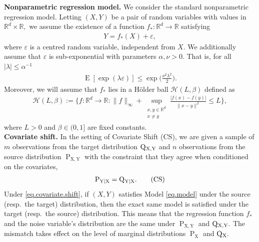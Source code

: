 \documentclass[10pt]{article}
\newcommand{\eps}{\varepsilon}
\newcommand{\mH}{\mathcal{H}}
\newcommand{\RR}{\mathbb{R}}
\newcommand{\E}{\operatorname{E}}
\renewcommand{\P}{\operatorname{P}}
\newcommand{\Q}{\operatorname{Q}}
\newcommand{\X}{\operatorname{X}}
\newcommand{\Y}{\operatorname{Y}}
\newcommand{\sY}{\mathrm{Y}}
\newcommand{\sX}{\mathrm{X}}
\begin{document}
\noindent\textbf{Nonparametric regression model.} We consider the standard nonparametric regression model. Letting $(X, Y)$ be a pair of random variables with values in $\RR^d \times \RR,$ we assume the existence of a function $f_* \colon \RR^d \to \RR$ satisfying
\begin{align}
    \label{eq.model}
    Y = f_*(X) + \eps,
\end{align}
where $\eps$ is a centred random variable, independent from $X.$ We additionally assume that $\eps$ is sub-exponential with parameters $\alpha, \nu >0.$ That is, for all $|\lambda| \leq \alpha^{-1}$
\begin{align*}
    \E[\exp(\lambda \eps)] \leq \exp\Big(\frac{\nu^2\lambda^2}{2}\Big). 
\end{align*}
Moreover, we will assume that $f_*$ lies in a H\"older ball $\mH(L, \beta)$ defined as 
\begin{align*}
    \mH(L, \beta) := \bigg\{f \colon \RR^d \to \RR: \|f\|_{\infty} + \sup_{\substack{x, y \in \RR^d\\ x\neq y}} \frac{|f(x) - f(y)|}{\|x - y\|^\beta} \leq L\bigg\},
\end{align*}
where $L > 0$ and $\beta \in (0, 1]$ are fixed constants.\\

\noindent\textbf{Covariate shift.} In the setting of Covariate Shift (CS), we are given a sample of $m$ observations from the target distribution $\Q\mathstrut_{\!\X, \sY}$ and $n$ observations from the source distribution $\P_{\sX, \sY}$ with the constraint that they agree when conditioned on the covariates,
\begin{align}
\label{eq.covariate.shift}
\P_{\sY|\sX} = \Q\mathstrut_{\!\Y\!|\sX}. \tag{CS}
\end{align}
Under \eqref{eq.covariate.shift}, if $(X, Y)$ satisfies Model \eqref{eq.model} under the source (resp.\ the target) distribution, then the exact same model is satisfied under the target (resp.\ the source) distribution. This means that the regression function $f_*$ and the noise variable's distribution are the same under $\P_{\sX, \sY}$ and $\Q\mathstrut_{\!\X, \sY}.$ The mismatch takes effect on the level of marginal distributions $\P_{\sX}$ and $\Q\mathstrut_{\!\sX}.$\\
\end{document}
